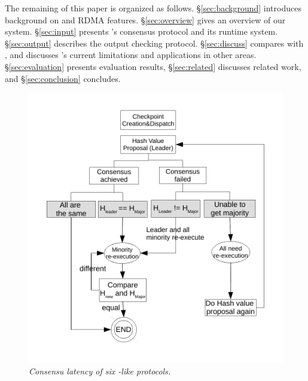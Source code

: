 

The remaining of this paper is organized as follows. 
\S\ref{sec:background} introduces background on \paxos and RDMA features. 
\S\ref{sec:overview} gives an overview of our \xxx system. \S\ref{sec:input} 
presents \xxx's consensus protocol and its runtime system. \S\ref{sec:output} 
describes the output checking protocol. \S\ref{sec:discuss} compares \dare with 
\xxx, and discusses \xxx's current limitations and applications in other areas. 
\S\ref{sec:evaluation} presents evaluation results, \S\ref{sec:related} 
discusses related work, and \S\ref{sec:conclusion} concludes. 

\begin{figure}[t]
\centering
\vspace{-.10in}
\includegraphics[width=.4\textwidth]{figures/output-divergence}
\vspace{-.50in}
\caption{{\em Consensu latency of six \paxos-like protocols.}} 
\label{fig:scalability}
\vspace{-.20in}
\end{figure}